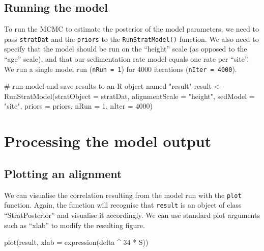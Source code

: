 \documentclass[
  letterpaper,
  DIV=11,
  numbers=noendperiod]{scrartcl}
\newenvironment{Shaded}{\begin{snugshade}}{\end{snugshade}}
\newcommand{\AttributeTok}[1]{\textcolor[rgb]{0.40,0.45,0.13}{#1}}
\newcommand{\CommentTok}[1]{\textcolor[rgb]{0.37,0.37,0.37}{#1}}
\newcommand{\DecValTok}[1]{\textcolor[rgb]{0.68,0.00,0.00}{#1}}
\newcommand{\FunctionTok}[1]{\textcolor[rgb]{0.28,0.35,0.67}{#1}}
\newcommand{\NormalTok}[1]{\textcolor[rgb]{0.00,0.23,0.31}{#1}}
\newcommand{\OtherTok}[1]{\textcolor[rgb]{0.00,0.23,0.31}{#1}}
\newcommand{\SpecialCharTok}[1]{\textcolor[rgb]{0.37,0.37,0.37}{#1}}
\newcommand{\StringTok}[1]{\textcolor[rgb]{0.13,0.47,0.30}{#1}}
\begin{document}
\subsection{Running the model}\label{running-the-model}

To run the MCMC to estimate the posterior of the model parameters, we
need to pass \texttt{stratDat} and the \texttt{priors} to the
\texttt{RunStratModel()} function. We also need to specify that the
model should be run on the ``height'' scale (as opposed to the ``age''
scale), and that our sedimentation rate model equals one rate per
``site''. We run a single model run (\texttt{nRun\ =\ 1}) for 4000
iterations (\texttt{nIter\ =\ 4000}).

\begin{Shaded}
\begin{Highlighting}[]
\CommentTok{\# run model and save results to an R object named "result"}
\NormalTok{result }\OtherTok{\textless{}{-}} \FunctionTok{RunStratModel}\NormalTok{(}\AttributeTok{stratObject =}\NormalTok{ stratDat, }\AttributeTok{alignmentScale =} \StringTok{"height"}\NormalTok{, }
                        \AttributeTok{sedModel =} \StringTok{"site"}\NormalTok{, }\AttributeTok{priors =}\NormalTok{ priors,  }
                        \AttributeTok{nRun =} \DecValTok{1}\NormalTok{, }\AttributeTok{nIter =} \DecValTok{4000}\NormalTok{)}
\end{Highlighting}
\end{Shaded}

\section{Processing the model output}\label{processing-the-model-output}

\subsection{Plotting an alignment}\label{plotting-an-alignment}

We can visualise the correlation resulting from the model run with the
\texttt{plot} function. Again, the function will recognise that
\texttt{result} is an object of class ``StratPosterior'' and visualise
it accordingly. We can use standard plot arguments such as ``xlab'' to
modify the resulting figure.

\begin{Shaded}
\begin{Highlighting}[]
\FunctionTok{plot}\NormalTok{(result, }\AttributeTok{xlab =} \FunctionTok{expression}\NormalTok{(delta }\SpecialCharTok{\^{}} \DecValTok{34} \SpecialCharTok{*}\NormalTok{ S))}
\end{Highlighting}
\end{Shaded}
\end{document}
